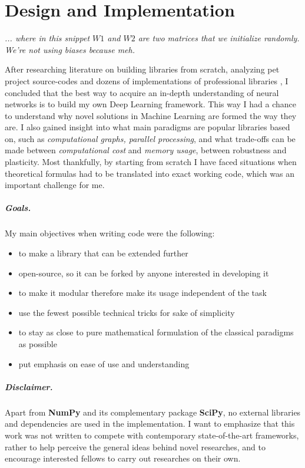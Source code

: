 \chapter{Design and Implementation}\label{cp:design}

\epigraph{\textit{... where in this snippet $W1$ and $W2$ are two matrices that we initialize randomly. We're not using biases because meh.}}{}

After researching literature on building libraries from scratch, analyzing pet project source-codes \cite{convnetjs, gibianskysource} and dozens of implementations of professional libraries \cite{TF, caffe, torch},
I concluded that the best way to acquire an in-depth understanding of neural networks is to build my own Deep Learning framework.
This way I had a chance to understand why novel solutions in Machine Learning are formed the way they are.
I also gained insight into what main paradigms are popular libraries based on, such as \emph{computational graphs, parallel processing}, 
and what trade-offs can be made between \emph{computational cost} and \emph{memory usage}, between robustness and plasticity.
Most thankfully, by starting from scratch I have faced situations when theoretical formulas had to be translated into exact working code, which was an important challenge for me.

\paragraph{Goals.} My main objectives when writing code were the following:
\begin{itemize}
    \item[] to make a library that can be extended further
    \item[] open-source, so it can be forked by anyone interested in developing it
    \item[] to make it modular therefore make its usage independent of the task
    \item[] use the fewest possible technical tricks for sake of simplicity
    \item[] to stay as close to pure mathematical formulation of the classical paradigms as possible
    \item[] put emphasis on ease of use and understanding
\end{itemize}
\paragraph{Disclaimer.} Apart from \textbf{NumPy} and its complementary package \textbf{SciPy}, no external libraries and dependencies are used in the implementation. 
I want to emphasize that this work was not written to compete with contemporary state-of-the-art frameworks, rather to help perceive the general ideas behind novel researches, and to encourage interested fellows to carry out researches on their own.
\clearpage
